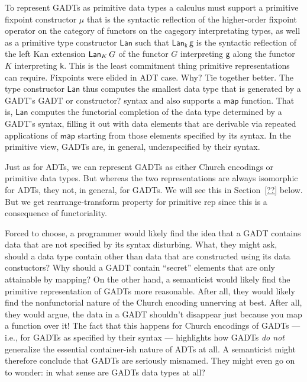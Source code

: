 \documentclass[acmsmall,screen,review,anonymous]{acmart}
\theoremstyle{definition}
\begin{document}
To represent GADTs as primitive data types a calculus must support a
primitive fixpoint constructor $\mathsf{\mu}$ that is the syntactic
reflection of the higher-order fixpoint operator on the category of
functors on the cagegory interpretating types, as well as a primitive
type constructor $\mathsf{Lan}$ such that $\mathsf{Lan_k\,g}$ is the
syntactic reflection of the left Kan extension $\mathsf{Lan}_K \,G$ of the
functor $G$ interpreting $\mathsf{g}$ along the functor $K$
interpreting $\mathsf{k}$. {\color{blue} This is the least commitment
  thing primitive representations can require. Fixpoints were elided
  in ADT case. Why? Tie together better.}  The type constructor
$\mathsf{Lan}$ thus computes the smallest data type that is generated
by a GADT's {\color{blue} GADT or constructor?} syntax and also
supports a $\mathsf{map}$ function. That is, $\mathsf{Lan}$ computes
the functorial completion of the data type determined by a GADT's
syntax, filling it out with data elements that are derivable via
repeated applications of $\mathsf{map}$ starting from those elements
specified by its syntax. In the primitive view, GADTs are, in general,
underspecified by their syntax.

Just as for ADTs, we can represent GADTs as either Church encodings or
primitive data types. But whereas the two representations are always
isomorphic for ADTs, they not, in general, for GADTs. We will see this
in Section~\ref{??} below. {\color{blue} But we get
  rearrange-transform property for primitive rep since this is a
  consequence of functoriality.}

{\color{blue}
Forced to choose, a programmer would likely find the idea that a GADT
contains data that are not specified by its syntax disturbing. What,
they might ask, should a data type contain other than data that are
constructed using its data constuctors? Why should a GADT contain
``secret'' elements that are only attainable by mapping? On the other
hand, a semanticist would likely find the primitive representation of
GADTs more reasonable. After all, they would likely find the
nonfunctorial nature of the Church encoding unnerving at best. After
all, they would argue, the data in a GADT shouldn't disappear just
because you map a function over it! The fact that this happens for
Church encodings of GADTs --- i.e., for GADTs as specified by their
syntax --- highlights how GADTs {\em do not} generalize the essential
container-ish nature of ADTs at all. A semanticist might therefore
conclude that GADTs are seriously misnamed. They might even go on to
wonder: in what sense are GADTs data types at all?}
\end{document}
